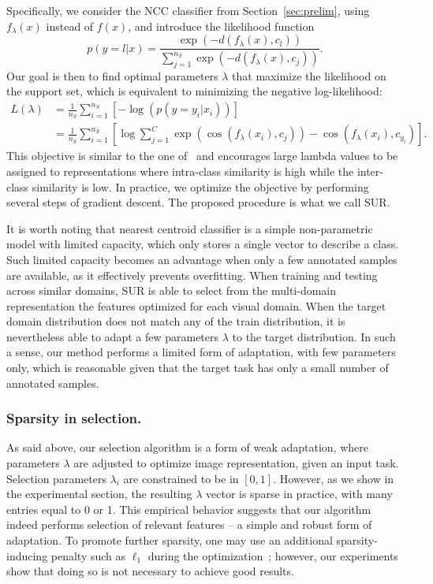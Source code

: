 \documentclass[runningheads]{llncs}
\begin{document}
Specifically, we consider the NCC classifier from Section~\ref{sec:prelim},
using $f_\lambda(x)$ instead of $f(x)$, and introduce the likelihood function
 \begin{equation}\label{eq:probs}
    p(y = l | x) = \frac{\exp(-d(f_\lambda(x), c_l))}{\sum_{j=1}^{n_S}{\exp(-d(f_\lambda(x), c_j))}}.
\end{equation}
Our goal is then to find optimal parameters ${\lambda}$ that
maximize  the likelihood on the support set, which is equivalent to
minimizing the negative log-likelihood:
\begin{align}\label{eq:loss}
  L({\lambda}) &= \frac{1}{n_S} \sum_{i=1}^{n_S}\left[{-\log(p(y = y_i | x_i))} \right] \\
             &= \frac{1}{n_S} \sum_{i=1}^{n_S} \left[ \log \sum_{j=1}^{C} \exp( \cos(f_\lambda(x_i), c_j) ) - \cos (f_\lambda(x_i), c_{y_i}) \right].
\end{align}
This objective is similar to the one of~\cite{wang2018cosface} and encourages
large lambda values to be assigned to representations where intra-class similarity is high
while the inter-class similarity is low. In practice, we optimize the objective
by performing several steps of gradient descent. The proposed procedure is what
we call SUR.

It is worth noting that nearest centroid classifier is a simple non-parametric
model with limited capacity, which only stores a single vector to describe a
class. Such limited capacity becomes an advantage when only a few annotated
samples are available, as it effectively prevents overfitting. When training
and testing across similar domains, SUR is able to select from the multi-domain
representation the features optimized for each visual domain. 
When the target domain distribution does not match any of the train distribution,
it is nevertheless able to adapt a few parameters $\lambda$ to the target distribution.
In such a sense, our method performs a limited form of adaptation, with
few parameters only, which is reasonable given that the target task has only a
small number of annotated samples.


\subsubsection{Sparsity in selection.} As said above, our selection
algorithm is a form of weak adaptation, where parameters ${\lambda}$ are adjusted
to optimize image representation, given an input task. Selection parameters
$\lambda_i$ are constrained to be in $[0, 1]$.
However, as we show in the experimental section, the resulting ${\lambda}$
vector is sparse in practice, with many entries equal to 0 or 1. This empirical behavior
suggests that our algorithm indeed performs selection of relevant features -- a
simple and robust form of adaptation. To promote further sparsity, one may use
an additional sparsity-inducing penalty such as $\ell_1$ during the
optimization~\cite{mairal2014sparse}; however, our experiments show that doing
so is not necessary to achieve good results.
\end{document}
